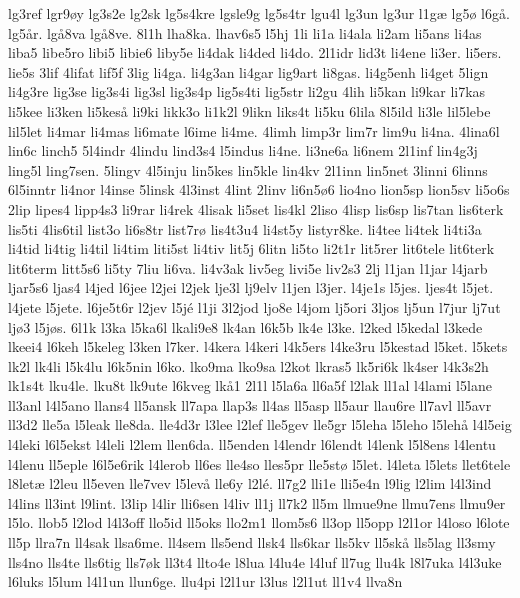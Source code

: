 {lg3ref
lgr9øy
lg3s2e
lg2sk
lg5s4kre
lgsle9g
lg5s4tr
lgu4l
lg3un
lg3ur
l1gæ
lg5ø
l6gå.
lg5år.
lgå8va
lgå8ve.
8l1h
lha8ka.
lhav6s5
l5hj
1li
li1a
li4ala
li2am
li5ans
li4as
liba5
libe5ro
libi5
libie6
liby5e
li4dak
li4ded
li4do.
2l1idr
lid3t
li4ene
li3er.
li5ers.
lie5s
3lif
4lifat
lif5f
3lig
li4ga.
li4g3an
li4gar
lig9art
li8gas.
li4g5enh
li4get
5lign
li4g3re
lig3se
lig3s4i
lig3sl
lig3s4p
lig5s4ti
lig5str
li2gu
4lih
li5kan
li9kar
li7kas
li5kee
li3ken
li5keså
li9ki
likk3o
li1k2l
9likn
liks4t
li5ku
6lila
8l5ild
li3le
lil5lebe
lil5let
li4mar
li4mas
li6mate
l6ime
li4me.
4limh
limp3r
lim7r
lim9u
li4na.
4lina6l
lin6c
linch5
5l4indr
4lindu
lind3s4
l5indus
li4ne.
li3ne6a
li6nem
2l1inf
lin4g3j
ling5l
ling7sen.
5lingv
4l5inju
lin5kes
lin5kle
lin4kv
2l1inn
lin5net
3linni
6linns
6l5inntr
li4nor
l4inse
5linsk
4l3inst
4lint
2linv
li6n5ø6
lio4no
lion5sp
lion5sv
li5o6s
2lip
lipes4
lipp4s3
li9rar
li4rek
4lisak
li5set
lis4kl
2liso
4lisp
lis6sp
lis7tan
lis6terk
lis5ti
4lis6til
list3o
li6s8tr
list7rø
lis4t3u4
li4st5y
listyr8ke.
li4tee
li4tek
li4ti3a
li4tid
li4tig
li4til
li4tim
liti5st
li4tiv
lit5j
6litn
li5to
li2t1r
lit5rer
lit6tele
lit6terk
lit6term
litt5s6
li5ty
7liu
li6va.
li4v3ak
liv5eg
livi5e
liv2s3
2lj
l1jan
l1jar
l4jarb
ljar5s6
ljas4
l4jed
l6jee
l2jei
l2jek
lje3l
lj9elv
l1jen
l3jer.
l4je1s
l5jes.
ljes4t
l5jet.
l4jete
l5jete.
l6je5t6r
l2jev
l5jé
l1ji
3l2jod
ljo8e
l4jom
lj5ori
3ljos
lj5un
l7jur
lj7ut
ljø3
l5jøs.
6l1k
l3ka
l5ka6l
lkali9e8
lk4an
l6k5b
lk4e
l3ke.
l2ked
l5kedal
l3kede
lkeei4
l6keh
l5keleg
l3ken
l7ker.
l4kera
l4keri
l4k5ers
l4ke3ru
l5kestad
l5ket.
l5kets
lk2l
lk4li
l5k4lu
l6k5nin
l6ko.
lko9ma
lko9sa
l2kot
lkras5
lk5ri6k
lk4ser
l4k3s2h
lk1s4t
lku4le.
lku8t
lk9ute
l6kveg
lkå1
2l1l
l5la6a
ll6a5f
l2lak
ll1al
l4lami
l5lane
ll3anl
l4l5ano
llans4
ll5ansk
ll7apa
llap3s
ll4as
ll5asp
ll5aur
llau6re
ll7avl
ll5avr
ll3d2
lle5a
l5leak
lle8da.
lle4d3r
l3lee
l2lef
lle5gev
lle5gr
l5leha
l5leho
l5lehå
l4l5eig
l4leki
l6l5ekst
l4leli
l2lem
llen6da.
ll5enden
l4lendr
l6lendt
l4lenk
l5l8ens
l4lentu
l4lenu
ll5eple
l6l5e6rik
l4lerob
ll6es
lle4so
lles5pr
lle5stø
l5let.
l4leta
l5lets
llet6tele
l8letæ
l2leu
ll5even
lle7vev
l5levå
lle6y
l2lé.
ll7g2
lli1e
lli5e4n
l9lig
l2lim
l4l3ind
l4lins
ll3int
l9lint.
l3lip
l4lir
lli6sen
l4liv
ll1j
ll7k2
ll5m
llmue9ne
llmu7ens
llmu9er
l5lo.
llob5
l2lod
l4l3off
llo5id
ll5oks
llo2m1
llom5s6
ll3op
ll5opp
l2l1or
l4loso
l6lote
ll5p
llra7n
ll4sak
llsa6me.
ll4sem
lls5end
llsk4
lls6kar
lls5kv
ll5skå
lls5lag
ll3smy
lls4no
lls4te
lls6tig
lls7øk
ll3t4
llto4e
l8lua
l4lu4e
l4luf
ll7ug
llu4k
l8l7uka
l4l3uke
l6luks
l5lum
l4l1un
llun6ge.
llu4pi
l2l1ur
l3lus
l2l1ut
ll1v4
llva8n
}
